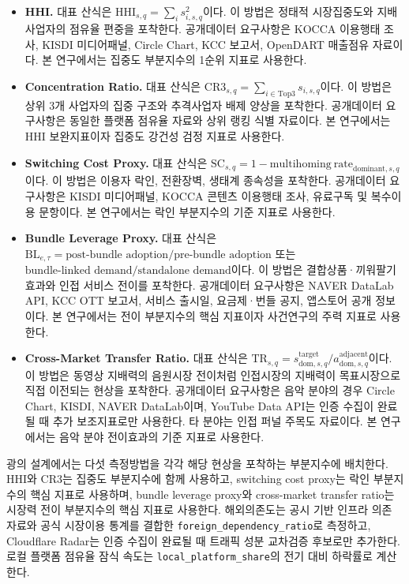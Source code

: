 \documentclass[11pt,a4paper]{report}
\begin{document}
\begin{table}[H]
  \centering
  \small
  \caption{\texorpdfstring{$I^{\mathrm{market}}$ 계량 방법 비교표}{Imarket 계량 방법 비교표}}\label{tab:imarket_method_compare}
\begin{itemize}[leftmargin=*, itemsep=0.7em]
  \item \textbf{HHI.} 대표 산식은 $\mathrm{HHI}_{s,q}=\sum_i s_{i,s,q}^2$이다. 이 방법은 정태적 시장집중도와 지배사업자의 점유율 편중을 포착한다. 공개데이터 요구사항은 KOCCA 이용행태 조사, KISDI 미디어패널, Circle Chart, KCC 보고서, OpenDART 매출점유 자료이다. 본 연구에서는 집중도 부분지수의 1순위 지표로 사용한다.
  \item \textbf{Concentration Ratio.} 대표 산식은 $\mathrm{CR3}_{s,q}=\sum_{i \in \mathrm{Top3}} s_{i,s,q}$이다. 이 방법은 상위 3개 사업자의 집중 구조와 추격사업자 배제 양상을 포착한다. 공개데이터 요구사항은 동일한 플랫폼 점유율 자료와 상위 랭킹 식별 자료이다. 본 연구에서는 HHI 보완지표이자 집중도 강건성 검정 지표로 사용한다.
  \item \textbf{Switching Cost Proxy.} 대표 산식은 $\mathrm{SC}_{s,q}=1-\mathrm{multihoming\ rate}_{\mathrm{dominant},s,q}$이다. 이 방법은 이용자 락인, 전환장벽, 생태계 종속성을 포착한다. 공개데이터 요구사항은 KISDI 미디어패널, KOCCA 콘텐츠 이용행태 조사, 유료구독 및 복수이용 문항이다. 본 연구에서는 락인 부분지수의 기준 지표로 사용한다.
  \item \textbf{Bundle Leverage Proxy.} 대표 산식은 $\mathrm{BL}_{e,\tau}=\text{post-bundle adoption}/\text{pre-bundle adoption}$ 또는 $\text{bundle-linked demand}/\text{standalone demand}$이다. 이 방법은 결합상품·끼워팔기 효과와 인접 서비스 전이를 포착한다. 공개데이터 요구사항은 NAVER DataLab API, KCC OTT 보고서, 서비스 출시일, 요금제·번들 공지, 앱스토어 공개 정보이다. 본 연구에서는 전이 부분지수의 핵심 지표이자 사건연구의 주력 지표로 사용한다.
  \item \textbf{Cross-Market Transfer Ratio.} 대표 산식은 $\mathrm{TR}_{s,q}=s^{\mathrm{target}}_{\mathrm{dom},s,q}/a^{\mathrm{adjacent}}_{\mathrm{dom},s,q}$이다. 이 방법은 동영상 지배력의 음원시장 전이처럼 인접시장의 지배력이 목표시장으로 직접 이전되는 현상을 포착한다. 공개데이터 요구사항은 음악 분야의 경우 Circle Chart, KISDI, NAVER DataLab이며, YouTube Data API는 인증 수집이 완료될 때 추가 보조지표로만 사용한다. 타 분야는 인접 퍼널 주목도 자료이다. 본 연구에서는 음악 분야 전이효과의 기준 지표로 사용한다.
\end{itemize}
\end{table}

광의 설계에서는 다섯 측정방법을 각각 해당 현상을 포착하는 부분지수에 배치한다. HHI와 CR3는 집중도 부분지수에 함께 사용하고, switching cost proxy는 락인 부분지수의 핵심 지표로 사용하며, bundle leverage proxy와 cross-market transfer ratio는 시장력 전이 부분지수의 핵심 지표로 사용한다. 해외의존도는 공시 기반 인프라 의존 자료와 공식 시장이용 통계를 결합한 \texttt{foreign\_dependency\_ratio}로 측정하고, Cloudflare Radar는 인증 수집이 완료될 때 트래픽 성분 교차검증 후보로만 추가한다. 로컬 플랫폼 점유율 잠식 속도는 \texttt{local\_platform\_share}의 전기 대비 하락률로 계산한다.
\end{document}
